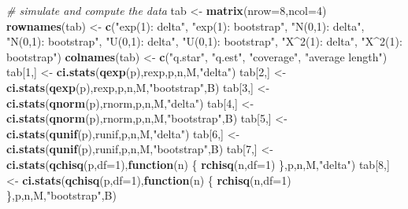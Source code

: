 \documentclass[
  11pt,
]{article}
\newenvironment{Shaded}{\begin{snugshade}}{\end{snugshade}}
\newcommand{\AttributeTok}[1]{\textcolor[rgb]{0.13,0.29,0.53}{#1}}
\newcommand{\CommentTok}[1]{\textcolor[rgb]{0.56,0.35,0.01}{\textit{#1}}}
\newcommand{\ControlFlowTok}[1]{\textcolor[rgb]{0.13,0.29,0.53}{\textbf{#1}}}
\newcommand{\DecValTok}[1]{\textcolor[rgb]{0.00,0.00,0.81}{#1}}
\newcommand{\FunctionTok}[1]{\textcolor[rgb]{0.13,0.29,0.53}{\textbf{#1}}}
\newcommand{\NormalTok}[1]{#1}
\newcommand{\OtherTok}[1]{\textcolor[rgb]{0.56,0.35,0.01}{#1}}
\newcommand{\StringTok}[1]{\textcolor[rgb]{0.31,0.60,0.02}{#1}}
\begin{document}
\begin{Shaded}
\begin{Highlighting}[]
\CommentTok{\# simulate and compute the data}
\NormalTok{tab }\OtherTok{\textless{}{-}} \FunctionTok{matrix}\NormalTok{(}\AttributeTok{nrow=}\DecValTok{8}\NormalTok{,}\AttributeTok{ncol=}\DecValTok{4}\NormalTok{)}
\FunctionTok{rownames}\NormalTok{(tab) }\OtherTok{\textless{}{-}} \FunctionTok{c}\NormalTok{(}\StringTok{"exp(1): delta"}\NormalTok{,}
                   \StringTok{"exp(1): bootstrap"}\NormalTok{,}
                   \StringTok{"N(0,1): delta"}\NormalTok{,}
                   \StringTok{"N(0,1): bootstrap"}\NormalTok{,}
                   \StringTok{"U(0,1): delta"}\NormalTok{,}
                   \StringTok{"U(0,1): bootstrap"}\NormalTok{,}
                   \StringTok{"X\^{}2(1): delta"}\NormalTok{,}
                   \StringTok{"X\^{}2(1): bootstrap"}\NormalTok{)}
\FunctionTok{colnames}\NormalTok{(tab) }\OtherTok{\textless{}{-}} \FunctionTok{c}\NormalTok{(}\StringTok{"q.star"}\NormalTok{, }\StringTok{"q.est"}\NormalTok{, }\StringTok{"coverage"}\NormalTok{, }\StringTok{"average length"}\NormalTok{)}
\NormalTok{tab[}\DecValTok{1}\NormalTok{,] }\OtherTok{\textless{}{-}} \FunctionTok{ci.stats}\NormalTok{(}\FunctionTok{qexp}\NormalTok{(p),rexp,p,n,M,}\StringTok{"delta"}\NormalTok{)}
\NormalTok{tab[}\DecValTok{2}\NormalTok{,] }\OtherTok{\textless{}{-}} \FunctionTok{ci.stats}\NormalTok{(}\FunctionTok{qexp}\NormalTok{(p),rexp,p,n,M,}\StringTok{"bootstrap"}\NormalTok{,B)}
\NormalTok{tab[}\DecValTok{3}\NormalTok{,] }\OtherTok{\textless{}{-}} \FunctionTok{ci.stats}\NormalTok{(}\FunctionTok{qnorm}\NormalTok{(p),rnorm,p,n,M,}\StringTok{"delta"}\NormalTok{)}
\NormalTok{tab[}\DecValTok{4}\NormalTok{,] }\OtherTok{\textless{}{-}} \FunctionTok{ci.stats}\NormalTok{(}\FunctionTok{qnorm}\NormalTok{(p),rnorm,p,n,M,}\StringTok{"bootstrap"}\NormalTok{,B)}
\NormalTok{tab[}\DecValTok{5}\NormalTok{,] }\OtherTok{\textless{}{-}} \FunctionTok{ci.stats}\NormalTok{(}\FunctionTok{qunif}\NormalTok{(p),runif,p,n,M,}\StringTok{"delta"}\NormalTok{)}
\NormalTok{tab[}\DecValTok{6}\NormalTok{,] }\OtherTok{\textless{}{-}} \FunctionTok{ci.stats}\NormalTok{(}\FunctionTok{qunif}\NormalTok{(p),runif,p,n,M,}\StringTok{"bootstrap"}\NormalTok{,B)}
\NormalTok{tab[}\DecValTok{7}\NormalTok{,] }\OtherTok{\textless{}{-}} \FunctionTok{ci.stats}\NormalTok{(}\FunctionTok{qchisq}\NormalTok{(p,}\AttributeTok{df=}\DecValTok{1}\NormalTok{),}\ControlFlowTok{function}\NormalTok{(n) \{ }\FunctionTok{rchisq}\NormalTok{(n,}\AttributeTok{df=}\DecValTok{1}\NormalTok{) \},p,n,M,}\StringTok{"delta"}\NormalTok{)}
\NormalTok{tab[}\DecValTok{8}\NormalTok{,] }\OtherTok{\textless{}{-}} \FunctionTok{ci.stats}\NormalTok{(}\FunctionTok{qchisq}\NormalTok{(p,}\AttributeTok{df=}\DecValTok{1}\NormalTok{),}\ControlFlowTok{function}\NormalTok{(n) \{ }\FunctionTok{rchisq}\NormalTok{(n,}\AttributeTok{df=}\DecValTok{1}\NormalTok{) \},p,n,M,}\StringTok{"bootstrap"}\NormalTok{,B)}
\end{Highlighting}
\end{Shaded}
\end{document}

